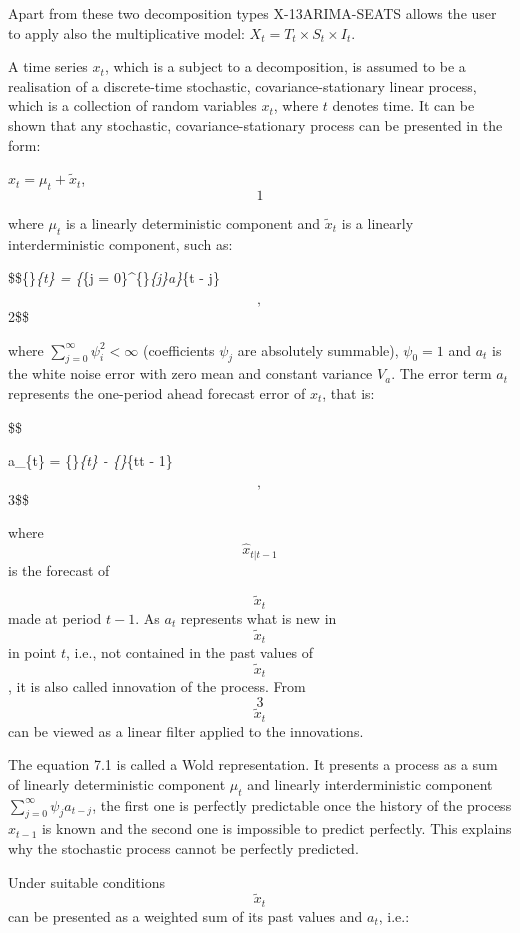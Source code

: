 \documentclass[
  letterpaper,
  DIV=11,
  numbers=noendperiod]{scrreprt}
\begin{document}
Apart from these two decomposition types X-13ARIMA-SEATS allows the user
to apply also the multiplicative model:
\(X_{t} = T_{t} \times S_{t} \times I_{t}\).

A time series \(x_{t}\), which is a subject to a decomposition, is
assumed to be a realisation of a discrete-time stochastic,
covariance-stationary linear process, which is a collection of random
variables \(x_{t}\), where \(t\) denotes time. It can be shown that any
stochastic, covariance-stationary process can be presented in the form:

\(x_{t} = \mu_{t} + {\widetilde{x}}_{t}\), \[1\]

where \(\mu_{t}\) is a linearly deterministic component and
\({\widetilde{x}}_{t}\) is a linearly interderministic component, such
as:

\$\$\{\}\emph{\{t\} = \{\sum}\{j =
0\}\^{}\{\infty\}\psi\emph{\{j\}a\}}\{t - j\}

\[, \]2\$\$

where \(\sum_{j = 0}^{\infty}\psi_{i}^{2} < \infty\) (coefficients
\(\psi_{j}\) are absolutely summable), \(\psi_{0} = 1\) and \(a_{t}\) is
the white noise error with zero mean and constant variance \(V_{a}\).
The error term \(a_{t}\) represents the one-period ahead forecast error
of \(x_{t}\), that is:

\$\$

a\_\{t\} = \{\}\emph{\{t\} - \{\}}\{t\textbar t
- 1\}

\[, \]3\$\$

where \[{\widehat{x}}_{t|t - 1}\] is the forecast of

\[{\widetilde{x}}_{t}\] made at period \(t - 1\). As \(a_{t}\)
represents what is new in \[{\widetilde{x}}_{t}\] in point \(t\), i.e.,
not contained in the past values of \[{\widetilde{x}}_{t}\], it is also
called innovation of the process. From \[3\] \[{\widetilde{x}}_{t}\] can
be viewed as a linear filter applied to the innovations.

The equation 7.1 is called a Wold representation. It presents a process
as a sum of linearly deterministic component \(\mu_{t}\) and linearly
interderministic component \(\sum_{j = 0}^{\infty}\psi_{j}a_{t - j}\),
the first one is perfectly predictable once the history of the process
\(x_{t - 1}\) is known and the second one is impossible to predict
perfectly. This explains why the stochastic process cannot be perfectly
predicted.

Under suitable conditions \[{\widetilde{x}}_{t}\] can be presented as a
weighted sum of its past values and \(a_{t}\), i.e.:
\end{document}
